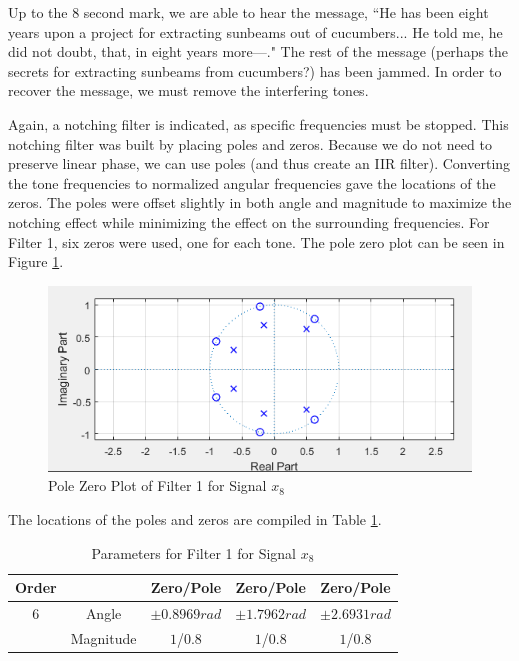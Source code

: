Up to the 8 second mark, we are able to hear the message, ``He has been eight years upon a project for extracting sunbeams out of cucumbers... He told me, he did not doubt, that, in eight years more---."  The rest of the message (perhaps the secrets for extracting sunbeams from cucumbers?) has been jammed.  In order to recover the message, we must remove the interfering tones.

Again, a notching filter is indicated, as specific frequencies must be stopped.  This notching filter was built by placing poles and zeros.  Because we do not need to preserve linear phase, we can use poles (and thus create an IIR filter).  Converting the tone frequencies to normalized angular frequencies gave the locations of the zeros.  The poles were offset slightly in both angle and magnitude to maximize the notching effect while minimizing the effect on the surrounding frequencies.  For Filter 1, six zeros were used, one for each tone.  The pole zero plot can be seen in Figure \ref{fig:x8_v7_polezero}.

\begin{figure}[H]
    \centering
    \includegraphics[width=0.5\linewidth]{figures/x8_v7_polezero.png}
    \caption{Pole Zero Plot of Filter 1 for Signal $x_8$}
    \label{fig:x8_v7_polezero}
\end{figure}

The locations of the poles and zeros are compiled in Table \ref{tab:x8_v7}.

\begin{table}[H]
    \centering
    \begin{tabular}{c|cccc}
         Order &      & Zero/Pole & Zero/Pole & Zero/Pole \\ \hline
         6 & Angle    & $\pm 0.8969 \unit{rad}$ & $\pm 1.7962 \unit{rad}$ & $\pm 2.6931 \unit{rad}$ \\
         & Magnitude  & $1$/$0.8$ & $1$/$0.8$ & $1$/$0.8$ 
    \end{tabular}
    \caption{Parameters for Filter 1 for Signal $x_8$}
    \label{tab:x8_v7}
\end{table}


